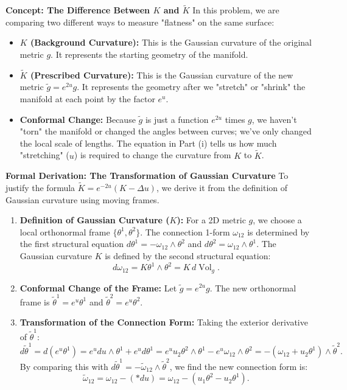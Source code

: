 \begin{solution}
\textbf{Concept: The Difference Between $K$ and $\widetilde{K}$}
In this problem, we are comparing two different ways to measure "flatness" on the same surface:
\begin{itemize}
    \item \textbf{$K$ (Background Curvature):} This is the Gaussian curvature of the original metric $g$. It represents the starting geometry of the manifold.
    \item \textbf{$\widetilde{K}$ (Prescribed Curvature):} This is the Gaussian curvature of the new metric $\widetilde{g} = e^{2u}g$. It represents the geometry after we "stretch" or "shrink" the manifold at each point by the factor $e^u$.
    \item \textbf{Conformal Change:} Because $\widetilde{g}$ is just a function $e^{2u}$ times $g$, we haven't "torn" the manifold or changed the angles between curves; we've only changed the local scale of lengths. The equation in Part (i) tells us how much "stretching" ($u$) is required to change the curvature from $K$ to $\widetilde{K}$.
\end{itemize}
\textbf{Formal Derivation: The Transformation of Gaussian Curvature}
To justify the formula $\widetilde{K} = e^{-2u}(K - \Delta u)$, we derive it from the definition of Gaussian curvature using moving frames.
\begin{enumerate}
    \item \textbf{Definition of Gaussian Curvature ($K$):} For a 2D metric $g$, we choose a local orthonormal frame $\{\theta^1, \theta^2\}$. The connection 1-form $\omega_{12}$ is determined by the first structural equation $d\theta^1 = -\omega_{12} \wedge \theta^2$ and $d\theta^2 = \omega_{12} \wedge \theta^1$. The Gaussian curvature $K$ is defined by the second structural equation:
    \[ d\omega_{12} = K \theta^1 \wedge \theta^2 = K \, d\operatorname{Vol}_g. \]
    
    \item \textbf{Conformal Change of the Frame:} Let $\widetilde{g} = e^{2u}g$. The new orthonormal frame is $\widetilde{\theta}^1 = e^u \theta^1$ and $\widetilde{\theta}^2 = e^u \theta^2$.
    
    \item \textbf{Transformation of the Connection Form:} Taking the exterior derivative of $\widetilde{\theta}^1$:
    \[ d\widetilde{\theta}^1 = d(e^u \theta^1) = e^u du \wedge \theta^1 + e^u d\theta^1 = e^u u_2 \theta^2 \wedge \theta^1 - e^u \omega_{12} \wedge \theta^2 = -(\omega_{12} + u_2 \theta^1) \wedge \widetilde{\theta}^2. \]
    By comparing this with $d\widetilde{\theta}^1 = -\widetilde{\omega}_{12} \wedge \widetilde{\theta}^2$, we find the new connection form is:
    \[ \widetilde{\omega}_{12} = \omega_{12} - (*du) = \omega_{12} - (u_1 \theta^2 - u_2 \theta^1). \]
    

\end{enumerate}
\end{solution}
